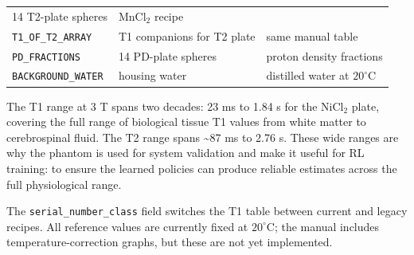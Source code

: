 \begin{longtable}[]{@{}lll@{}}
\begin{minipage}[t]{0.30\columnwidth}
14 T2-plate spheres\strut
\end{minipage} & \begin{minipage}[t]{0.27\columnwidth}\raggedright
MnCl\(_2\) recipe\strut
\end{minipage}\tabularnewline
\begin{minipage}[t]{0.34\columnwidth}\raggedright
\texttt{T1\_OF\_T2\_ARRAY}\strut
\end{minipage} & \begin{minipage}[t]{0.30\columnwidth}\raggedright
T1 companions for T2 plate\strut
\end{minipage} & \begin{minipage}[t]{0.27\columnwidth}\raggedright
same manual table\strut
\end{minipage}\tabularnewline
\begin{minipage}[t]{0.34\columnwidth}\raggedright
\texttt{PD\_FRACTIONS}\strut
\end{minipage} & \begin{minipage}[t]{0.30\columnwidth}\raggedright
14 PD-plate spheres\strut
\end{minipage} & \begin{minipage}[t]{0.27\columnwidth}\raggedright
proton density fractions\strut
\end{minipage}\tabularnewline
\begin{minipage}[t]{0.34\columnwidth}\raggedright
\texttt{BACKGROUND\_WATER}\strut
\end{minipage} & \begin{minipage}[t]{0.30\columnwidth}\raggedright
housing water\strut
\end{minipage} & \begin{minipage}[t]{0.27\columnwidth}\raggedright
distilled water at \(20^{\circ}\text{C}\)\strut
\end{minipage}\tabularnewline
\bottomrule
\end{longtable}

The T1 range at 3 T spans two decades: 23 ms to 1.84 s for the NiCl\(_2\)
plate, covering the full range of biological tissue T1 values from white
matter to cerebrospinal fluid. The T2 range spans \textasciitilde87 ms
to 2.76 s. These wide ranges are why the phantom is used for system
validation and make it useful for RL training: to ensure the learned
policies can produce reliable estimates across the full physiological
range.

The \texttt{serial\_number\_class} field switches the T1 table between
current and legacy recipes. All reference values are currently fixed at
\(20^{\circ}\text{C}\); the manual includes temperature-correction
graphs, but these are not yet implemented.

